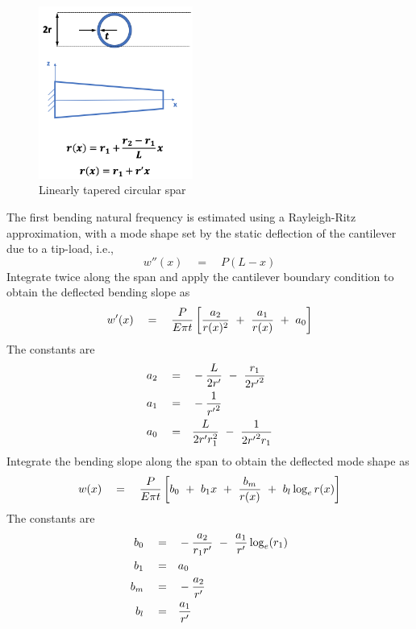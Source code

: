\begin{figure}
\begin{center}
\includegraphics[width=0.45\textwidth]{images/taper_beam.png}
\vspace{-0.1cm}
\caption{Linearly tapered circular spar}
\label{fig:taper_beam}
\end{center}
\end{figure}

The first bending natural frequency is estimated using a Rayleigh-Ritz approximation, with a mode shape set by the static deflection of the cantilever due to a tip-load, i.e.,
\begin{equation}
w''(x) \quad = \quad P (L - x)
\end{equation}
Integrate twice along the span and apply the cantilever boundary condition to obtain the deflected bending slope as 
\begin{equation}
w'(x) \quad = \quad \frac{P}{E\pi t}\left[\frac{a_2}{r(x)^2} \textrm{ }+\textrm{ } \frac{a_1}{r(x)} \textrm{ }+\textrm{ } a_0\right]
\end{equation}
The constants are 
\begin{align*}
a_2 \quad =& \quad -\frac{L}{2r'} \textrm{ }-\textrm{ } \frac{r_1}{2{r'}^2} \\
a_1 \quad =& \quad -\frac{1}{{r'}^2} \\
a_0 \quad =& \quad \frac{L}{2r'r_1^2} \textrm{ }-\textrm{ } \frac{1}{2{r'}^2 r_1}
\end{align*}
Integrate the bending slope along the span to obtain the deflected mode shape as 
\begin{equation}
w(x) \quad = \quad \frac{P}{E\pi t}\left[b_0 \textrm{ } + \textrm{ } b_1 x \textrm{ }+\textrm{ } \frac{b_m}{r(x)} \textrm{ }+\textrm{ } b_l \log_e r(x)\right]
\end{equation}
The constants are 
\begin{align*}
b_0 \quad =& \quad -\frac{a_2}{r_1 r'} \textrm{ }-\textrm{ } \frac{a_1}{r'} \log_e(r_1)\\
b_1 \quad =& \quad a_0 \\
b_m \quad =& \quad -\frac{a_2}{r'}  \\
b_l \quad =& \quad \frac{a_1}{r'} 
\end{align*}
